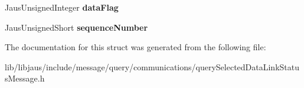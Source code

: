 \begin{DoxyCompactItemize}
\item 
\hypertarget{struct_query_selected_data_link_status_message_struct_ab8a0bdb46579189f272c4284d5938270}{\-Jaus\-Unsigned\-Integer {\bfseries data\-Flag}}\label{struct_query_selected_data_link_status_message_struct_ab8a0bdb46579189f272c4284d5938270}

\item 
\hypertarget{struct_query_selected_data_link_status_message_struct_a720db08dcb5be799416fa9f80bd2f8d3}{\-Jaus\-Unsigned\-Short {\bfseries sequence\-Number}}\label{struct_query_selected_data_link_status_message_struct_a720db08dcb5be799416fa9f80bd2f8d3}

\end{DoxyCompactItemize}


\-The documentation for this struct was generated from the following file\-:\begin{DoxyCompactItemize}
\item 
lib/libjaus/include/message/query/communications/query\-Selected\-Data\-Link\-Status\-Message.\-h\end{DoxyCompactItemize}
